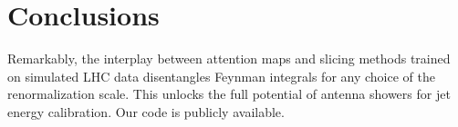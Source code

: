 \section{Conclusions}\label{sec:conclusions}

Remarkably, the interplay between attention maps and slicing methods
trained on simulated LHC data disentangles Feynman integrals for any
choice of the renormalization scale. This unlocks the full potential of
antenna showers for jet energy calibration. Our code is publicly
available.

